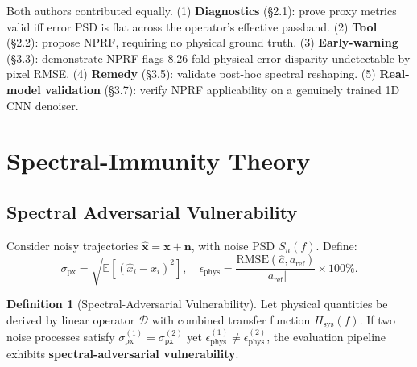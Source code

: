 \documentclass[9pt,twocolumn]{article}
\theoremstyle{remark}
\theoremstyle{definition}
\newtheorem{definition}[proposition]{Definition}
\newcommand{\pxrmse}{\sigma_{\text{px}}}
\newcommand{\physerr}{\epsilon_{\text{phys}}}
\newcommand{\snf}{S_n(f)}
\begin{document}
Both authors contributed equally. (1) \textbf{Diagnostics} (\S 2.1): prove proxy metrics valid iff error PSD is flat across the operator's effective passband. (2) \textbf{Tool} (\S 2.2): propose NPRF, requiring no physical ground truth. (3) \textbf{Early-warning} (\S 3.3): demonstrate NPRF flags 8.26-fold physical-error disparity undetectable by pixel RMSE. (4) \textbf{Remedy} (\S 3.5): validate post-hoc spectral reshaping. (5) \textbf{Real-model validation} (\S 3.7): verify NPRF applicability on a genuinely trained 1D CNN denoiser.

\section{Spectral-Immunity Theory}

\subsection{Spectral Adversarial Vulnerability}

Consider noisy trajectories $\hat{\mathbf{x}} = \mathbf{x} + \mathbf{n}$, with noise PSD $\snf$. Define:
\begin{equation}
\label{eq:metrics}
\pxrmse = \sqrt{\mathbb{E}[(\hat{x}_i - x_i)^2]}, \quad \physerr = \frac{\text{RMSE}(\hat{a}, a_{\text{ref}})}{|a_{\text{ref}}|} \times 100\%.
\end{equation}

\begin{definition}[Spectral-Adversarial Vulnerability]
Let physical quantities be derived by linear operator $\mathcal{D}$ with combined transfer function $H_{\text{sys}}(f)$. If two noise processes satisfy $\pxrmse^{(1)}=\pxrmse^{(2)}$ yet $\physerr^{(1)}\neq\physerr^{(2)}$, the evaluation pipeline exhibits \textbf{spectral-adversarial vulnerability}.
\end{definition}
\end{document}
